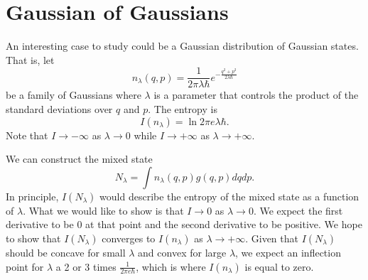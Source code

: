 \documentclass[11pt]{article}
\begin{document}
\section{Gaussian of Gaussians}

An interesting case to study could be a Gaussian distribution of Gaussian states. That is, let 
\begin{equation}
	n_\lambda(q,p) = \frac{1}{2 \pi \lambda \hbar} e^{-\frac{q^2 + p^2}{2 \lambda \hbar}}
\end{equation}
be a family of Gaussians where $\lambda$ is a parameter that controls the product of the standard deviations over $q$ and $p$. The entropy is
\begin{equation}
	I(n_\lambda) = \ln 2 \pi e \lambda \hbar.
\end{equation}
Note that $I \to - \infty$ as $\lambda \to 0$ while $I \to + \infty$ as $\lambda \to + \infty$.

We can construct the mixed state
\begin{equation}
	N_\lambda = \int n_\lambda(q,p) g(q,p) dq dp.
\end{equation}
In principle, $I(N_\lambda)$ would describe the entropy of the mixed state as a function of $\lambda$. What we would like to show is that $I \to 0$ as $\lambda \to 0$. We expect the first derivative to be $0$ at that point and the second derivative to be positive. We hope to show that $I(N_\lambda)$ converges to $I(n_\lambda)$ as $\lambda \to +\infty$. Given that $I(N_\lambda)$ should be concave for small $\lambda$ and convex for large $\lambda$, we expect an inflection point for $\lambda$ a 2 or 3 times $\frac{1}{2 \pi e \hbar}$, which is where $I(n_\lambda)$ is equal to zero.
\end{document}
